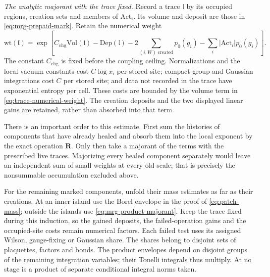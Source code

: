 \documentclass[11pt,letterpaper,reqno]{amsart}
\theoremstyle{definition}
\theoremstyle{remark}
\begin{document}
\emph{The analytic majorant with the trace fixed.}
Record a trace \(\mathfrak l\) by its occupied regions, creation
sets and members of \(\mathrm{Act}_i\). Its volume and deposit
are those in \eqref{eq:mrg-prepaid-mark}. Retain the numerical
weight
\begin{equation}\label{eq:trace-numerical-weight}
 \mathrm{wt}(\mathfrak l)=
 \exp\!\left[
 C_{\mathrm{chg}}\mathrm{Vol}(\mathfrak l)
 -\mathrm{Dep}(\mathfrak l)
 -2\sum_{(i,W)\text{ created}}p_0(g_i)
 -\sum_i|\mathrm{Act}_i|p_0(g_i)\right].
\end{equation}
The constant \(C_{\mathrm{chg}}\) is fixed before the coupling
ceiling. Normalizations and the local vacuum constants cost
\(C\log x_i\) per stored site; compact-group and Gaussian
integrations cost \(C\) per stored site; and data not recorded
in the trace have exponential entropy per cell. These costs
are bounded by the volume term in
\eqref{eq:trace-numerical-weight}. The creation deposits and
the two displayed linear gains are retained, rather than
absorbed into that term.

There is an important order to this estimate. First sum the
histories of components that have already healed and absorb
them into the local exponent by the exact operation
\(\mathbf R\). Only then take a majorant of the terms with
the prescribed live traces. Majorizing every healed component
separately would leave an independent sum of small weights
at every old scale; that is precisely the nonsummable
accumulation excluded above.

For the remaining marked components, unfold their mass
estimates as far as their creations. At an inner island use
the Borel envelope in the proof of \eqref{eq:patch-mass};
outside the islands use \eqref{eq:mrg-product-majorant}.
Keep the trace fixed during this induction, so the gained
deposits, the failed-operation gains and the occupied-site
costs remain numerical factors. Each failed test uses its
assigned Wilson, gauge-fixing or Gaussian share. The shares
belong to disjoint sets of plaquettes, factors and bonds.
The product envelopes depend on disjoint groups of the
remaining integration variables; their Tonelli integrals
thus multiply. At no stage is a product of separate
conditional integral norms taken.
\end{document}
